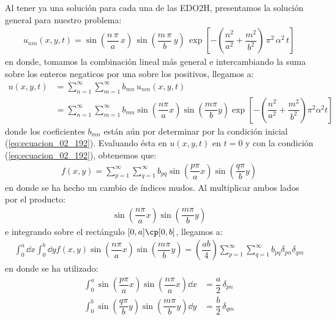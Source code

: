Al tener ya una solución para cada una de las EDO2H, presentamos la solución general para nuestro problema:
\begin{align}
u_{nm}(x, y, t) = \sin \left( \dfrac{n \, \pi}{a} \, x \right) \, \sin \left( \dfrac{m \, \pi}{b} \, y \right) \, \exp\left[ - \left( \dfrac{n^{2}}{a^{2}} + \dfrac{m^{2}}{b^{2}} \right) \, \pi^{2} \, \alpha^{2} \, t \right]
\label{eq:ecuacion_02_206}
\end{align}
en donde, tomamos la combinación lineal más general e intercambiando la suma sobre los enteros negaticos por una sobre los positivos, llegamos a:
\begin{align}
u(x, y, t) &= \sum_{n=1}^{\infty} \sum_{m=1}^{\infty} b_{mn} \, u_{nm} (x, y, t) \label{eq:ecuacion_02_207} \\[0.5em]
&= \sum_{n=1}^{\infty} \sum_{m=1}^{\infty} b_{mn} \sin \left( \dfrac{n \pi}{a} x \right) \sin \left( \dfrac{m \pi}{b} y \right) \exp\left[ - \left( \dfrac{n^{2}}{a^{2}} {+} \dfrac{m^{2}}{b^{2}} \right) \pi^{2} \alpha^{2} t \right] \label{eq:ecuacion_02_208}
\end{align}
donde los coeficientes $b_{mn}$ están aún por determinar por la condición inicial (\ref{eq:ecuacion_02_192}). Evaluando ésta en $u(x, y, t)$ en $t = 0$ y con la condición (\ref{eq:ecuacion_02_192}), obtenemos que:
\begin{align}
f(x,y) = \sum_{p=1}^{\infty} \sum_{q=1}^{\infty} b_{pq} \sin \left( \dfrac{p \pi}{a} x \right) \sin \left( \dfrac{q \pi}{b} y \right) 
\end{align}
en donde se ha hecho un cambio de índices mudos. Al multiplicar ambos lados por el producto:
\begin{align*}
\sin \left( \dfrac{n \pi}{a} x \right) \sin \left( \dfrac{m \pi}{b} y \right) 
\end{align*}
e integrando sobre el rectángulo $[0, a] \cp [0, b]$, llegamos a:
\begin{align}
\int_{0}^{a} \dd{x} \int_{0}^{b} \dd{y} f(x, y) \sin \left( \dfrac{n \pi}{a} x \right) \sin \left( \dfrac{m \pi}{b} y \right) = \left( \dfrac{a b}{4} \right) \sum_{p=1}^{\infty} \sum_{q=1}^{\infty} b_{pq} \delta_{pn} \delta_{qm}
\label{eq:ecuacion_02_210}
\end{align}
en donde se ha utilizado:
\begin{align}
\int_{0}^{a} \sin \left( \dfrac{p \pi}{a} x \right) \sin \left( \dfrac{n \pi}{a} x \right) \dd{x} &= \dfrac{a}{2} \, \delta_{pn} \label{eq:ecuacion_02_211} \\[0.5em]
\int_{0}^{b} \sin \left( \dfrac{q \pi}{b} y \right) \sin \left( \dfrac{m \pi}{b} y \right) \dd{y} &= \dfrac{b}{2} \, \delta_{qm} \label{eq:ecuacion_02_212}
\end{align}
